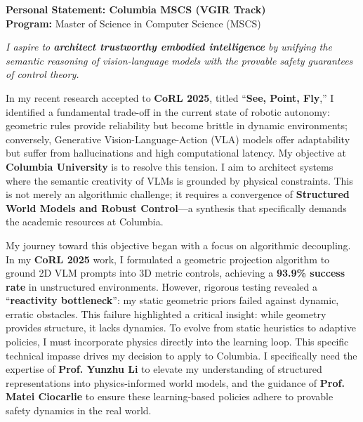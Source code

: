 \documentclass[12pt]{article}
\begin{document}
\begin{center}
    {\Large \textbf{Personal Statement: Columbia MSCS (VGIR Track)}} \\
    \vspace{0.5em}
    \textbf{Program:} Master of Science in Computer Science (MSCS)
\end{center}
\vspace{1em}


\emph{I aspire to \textbf{architect trustworthy embodied intelligence} by unifying the semantic reasoning of vision-language models with the provable safety guarantees of control theory.}

In my recent research accepted to \textbf{CoRL 2025}, titled ``\textbf{See, Point, Fly},'' I identified a fundamental trade-off in the current state of robotic autonomy: geometric rules provide reliability but become brittle in dynamic environments; conversely, Generative Vision-Language-Action (VLA) models offer adaptability but suffer from hallucinations and high computational latency. My objective at \textbf{Columbia University} is to resolve this tension. I aim to architect systems where the semantic creativity of VLMs is grounded by physical constraints. This is not merely an algorithmic challenge; it requires a convergence of \textbf{Structured World Models and Robust Control}—a synthesis that specifically demands the academic resources at Columbia.

My journey toward this objective began with a focus on algorithmic decoupling. In my \textbf{CoRL 2025} work, I formulated a geometric projection algorithm to ground 2D VLM prompts into 3D metric controls, achieving a \textbf{93.9\% success rate} in unstructured environments. However, rigorous testing revealed a ``\textbf{reactivity bottleneck}'': my static geometric priors failed against dynamic, erratic obstacles. This failure highlighted a critical insight: while geometry provides structure, it lacks dynamics. To evolve from static heuristics to adaptive policies, I must incorporate physics directly into the learning loop. This specific technical impasse drives my decision to apply to Columbia. I specifically need the expertise of \textbf{Prof. Yunzhu Li} to elevate my understanding of structured representations into physics-informed world models, and the guidance of \textbf{Prof. Matei Ciocarlie} to ensure these learning-based policies adhere to provable safety dynamics in the real world.
\end{document}
